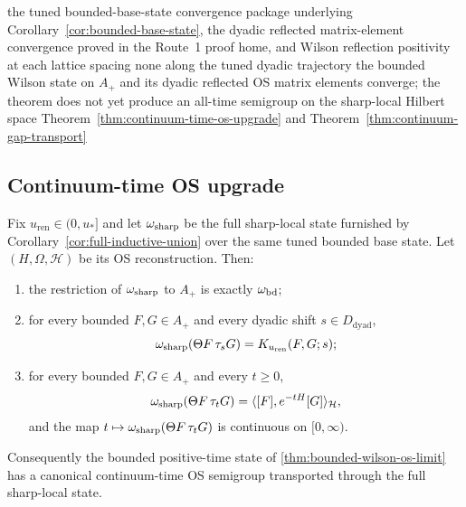 \dependencyledger
  {the tuned bounded-base-state convergence package underlying Corollary~\ref{cor:bounded-base-state}, the dyadic reflected matrix-element convergence proved in the Route~1 proof home, and Wilson reflection positivity at each lattice spacing}
  {none}
  {along the tuned dyadic trajectory the bounded Wilson state on $A_+$ and its dyadic reflected OS matrix elements converge; the theorem does not yet produce an all-time semigroup on the sharp-local Hilbert space}
  {Theorem~\ref{thm:continuum-time-os-upgrade} and Theorem~\ref{thm:continuum-gap-transport}}

\subsection{Continuum-time OS upgrade}

\begin{theorem}\label{thm:continuum-time-os-upgrade}
Fix $u_{\mathrm{ren}}\in(0,u_*]$ and let $\omega_{\mathrm{sharp}}$ be the full sharp-local state furnished by Corollary~\ref{cor:full-inductive-union} over the same tuned bounded base state. Let $(H,\Omega,\mathcal H)$ be its OS reconstruction. Then:
\begin{enumerate}[label=\textup{(\roman*)},leftmargin=2.25em]
\item the restriction of $\omega_{\mathrm{sharp}}$ to $A_+$ is exactly $\omega_{\mathrm{bd}}$;
\item for every bounded $F,G\in A_+$ and every dyadic shift $s\in D_{\mathrm{dyad}}$,
\[
\omega_{\mathrm{sharp}}(\Theta F\,\tau_s G)=K_{u_{\mathrm{ren}}}(F,G;s);
\]
\item for every bounded $F,G\in A_+$ and every $t\ge 0$,
\[
\omega_{\mathrm{sharp}}(\Theta F\,\tau_t G)=\langle [F],e^{-tH}[G]\rangle_{\mathcal H},
\]
and the map $t\mapsto \omega_{\mathrm{sharp}}(\Theta F\,\tau_t G)$ is continuous on $[0,\infty)$.
\end{enumerate}
Consequently the bounded positive-time state of \cref{thm:bounded-wilson-os-limit} has a canonical continuum-time OS semigroup transported through the full sharp-local state.
\end{theorem}

